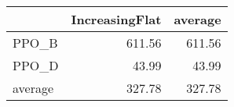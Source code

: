 \begin{tabular}{lrr}
\toprule
{} &  IncreasingFlat &  average \\
\midrule
PPO\_B   &          611.56 &   611.56 \\
PPO\_D   &           43.99 &    43.99 \\
average &          327.78 &   327.78 \\
\bottomrule
\end{tabular}
